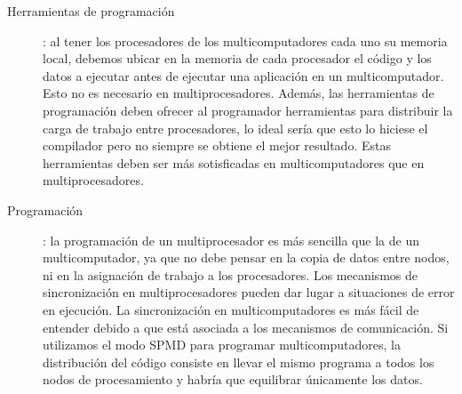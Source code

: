 \documentclass[10pt,a4paper,spanish]{report}
\begin{document}
\begin{description}
\item[Herramientas de programación]: al tener los procesadores de los multicomputadores cada uno su memoria local, debemos ubicar en la memoria de cada procesador el código y los datos a ejecutar antes de ejecutar una aplicación en un multicomputador. Esto no es necesario en multiprocesadores. Además, las herramientas de programación deben ofrecer al programador herramientas para distribuir la carga de trabajo entre procesadores, lo ideal sería que esto lo hiciese el compilador pero no siempre se obtiene el mejor resultado. Estas herramientas deben ser más sotisficadas en multicomputadores que en multiprocesadores.
\item[Programación]: la programación de un multiprocesador es más sencilla que la de un multicomputador, ya que no debe pensar en la copia de datos entre nodos, ni en la asignación de trabajo a los procesadores. Los mecanismos de sincronización en multiprocesadores pueden dar lugar a situaciones de error en ejecución. La sincronización en multicomputadores es más fácil de entender debido a que está asociada a los mecanismos de comunicación. Si utilizamos el modo SPMD para programar multicomputadores, la distribución del código consiste en llevar el mismo programa a todos los nodos de procesamiento y habría que equilibrar únicamente los datos.
\end{description}
\end{document}
